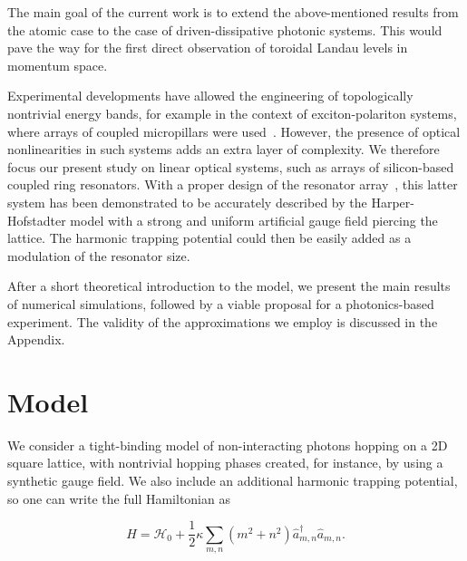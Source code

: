 \documentclass[twocolumn, 10pt, aps, superscriptaddress, floatfix, showpacs, pra, citeautoscript]{revtex4-1}
\newcommand{\co}[2]{#2}
\renewcommand{\paragraph}{\co}
\begin{document}
\paragraph{The main goal and its importance.}
The main goal of the current work is to extend the above-mentioned
results from the atomic case to the case of driven-dissipative
photonic systems. This would pave the way for the first direct
observation of toroidal Landau levels in momentum space.


\paragraph{Hafezi's arrays could be used for HH physics.}
Experimental developments have allowed the engineering of
topologically nontrivial energy bands, for example in the context of
exciton-polariton systems, where arrays of coupled micropillars were
used~\cite{jacqmin2014dirac}. However, the presence of optical
nonlinearities in such systems adds an extra layer of complexity.  We
therefore focus our present study on linear optical systems, such as
arrays of silicon-based coupled ring resonators.  With a proper design
of the resonator array~\cite{hafezi2013imaging}, this latter system
has been demonstrated to be accurately described by the
Harper-Hofstadter model with a strong and uniform artificial gauge
field piercing the lattice.  The harmonic trapping potential could
then be easily added as a modulation of the resonator size.


\paragraph{Summary of the manuscript}
After a short theoretical introduction to the model, we present the
main results of numerical simulations, followed by a viable proposal
for a photonics-based experiment. The validity of the approximations
we employ is discussed in the Appendix.

\section{Model}
\label{sec:model}

We consider a tight-binding model of non-interacting photons hopping
on a 2D square lattice, with nontrivial hopping phases created, for
instance, by using a synthetic gauge field. We also include an
additional harmonic trapping potential, so one can write the full Hamiltonian as

\begin{equation}\label{eq:model}
H=\mathcal{H}_0+\frac{1}{2}\kappa
\sum_{m,n}(m^{2}+n^{2})\hat{a}_{m,n}^{\dagger}\hat{a}_{m,n}.
\end{equation}
\end{document}
